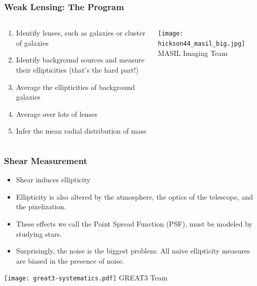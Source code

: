 \documentclass{beamer}
\begin{document}
\frame
{
    \frametitle{Weak Lensing: The Program}

    \begin{columns}
        \begin{column}{0.5\textwidth}    
            \begin{enumerate}

                \item Identify lenses, such as galaxies or cluster of galaxies

                \item Identify background sources and measure their
                    ellipticities {\color{gold}(that's the hard part!)}


                \item Average the ellipticities of background galaxies

                \item Average over lots of lenses

                \item Infer the mean radial distribution of mass

            \end{enumerate}
        \end{column}
        \begin{column}{0.5\textwidth}
            \begin{center}
                \texttt{[image: hickson44\_masil\_big.jpg]}
                \newline
                {\tiny MASIL Imaging Team}
            \end{center}
        \end{column}
    \end{columns}
}


\frame
{
    \frametitle{Shear Measurement}

    \begin{itemize}

        \item Shear induces ellipticity

        \item Ellipticity is also altered by the atmosphere, the optics
            of the telescope, and the pixelization.
        
        \item These effects we call the Point Spread Function (PSF),
            must be modeled by studying stars.

        \item Surprisingly, the noise is the biggest problem:  All
            naive ellipticity measures are biased in the presence of
            noise.

    \end{itemize}
    \begin{center}
        \texttt{[image: great3-systematics.pdf]}
        \newline
        {\tiny GREAT3 Team}
    \end{center}
}
\end{document}
